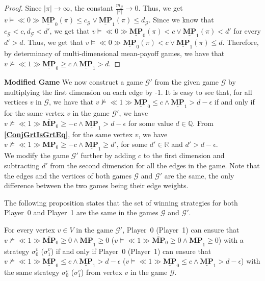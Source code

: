 \begin{proof}
    Since $|\pi| \to \infty$, the constant $\frac{m_\mathcal{G}}{|\pi|} \to 0$. Thus, we get $v \models \ll 0 \gg \underline{\mathbf{MP}}_0(\pi) \leqslant c_\mathcal{G} \lor \underline{\mathbf{MP}}_1(\pi) \leqslant d_\mathcal{G}$. Since we know that $c_\mathcal{G} < c, d_\mathcal{G} < d'$, we get that $v \models \ll 0 \gg \underline{\mathbf{MP}}_0(\pi) < c \lor \underline{\mathbf{MP}}_1(\pi) < d'$ for every $d' > d$. Thus, we get that  $v \models \ll 0 \gg \underline{\mathbf{MP}}_0(\pi) < c \lor \underline{\mathbf{MP}}_1(\pi) \leqslant d$. Therefore, by determinacy of multi-dimensional mean-payoff games, we have that $v \nvDash \ll 1 \gg \underline{\mathbf{MP}}_0 \geqslant c \land \underline{\mathbf{MP}}_1 > d$.
\end{proof}

\textbf{Modified Game} We now construct a game $\mathcal{G'}$ from the given game $\mathcal{G}$ by multiplying the first dimension on each edge by -1. It is easy to see that, for all vertices $v$ in $\mathcal{G}$, we have that $v \nvDash \ll 1 \gg \underline{\mathbf{MP}}_0 \leqslant c \land \underline{\mathbf{MP}}_1 > d-\epsilon$ if and only if for the same vertex $v$ in the game $\mathcal{G'}$, we have $v \nvDash \ll 1 \gg \overline{\mathbf{MP}}_0 \geqslant -c \land \underline{\mathbf{MP}}_1 > d-\epsilon$ for some value $d \in \mathbb{Q}$. From \textbf{\cref{ConjGrtIsGrtEq}}, for the same vertex $v$, we have $v \nvDash \ll 1 \gg \overline{\mathbf{MP}}_0 \geqslant -c \land \underline{\mathbf{MP}}_1 \geqslant d'$, for some $d' \in \mathbb{R}$ and $d' > d - \epsilon$. \\ \noindent
We modify the game $\mathcal{G'}$ further by adding $c$ to the first dimension and subtracting $d'$ from the second dimension for all the edges in the game. Note that the edges and the vertices of both games $\mathcal{G}$ and $\mathcal{G'}$ are the same, the only difference between the two games being their edge weights.

\noindent The following proposition states that the set of winning strategies for both Player~0 and Player~1 are the same in the games $\mathcal{G}$ and $\mathcal{G'}$.

\begin{proposition}
    \label{PropGamStrEqNewGamStr}
    For every vertex $v \in V$ in the game $\mathcal{G'}$, Player~0 (Player~1) can ensure that $v \nvDash \ll 1 \gg \overline{\mathbf{MP}}_0 \geqslant 0 \land \underline{\mathbf{MP}}_1 \geqslant 0$ ($v \models \ll 1 \gg \overline{\mathbf{MP}}_0 \geqslant 0 \land \underline{\mathbf{MP}}_1 \geqslant 0$) with a strategy $\sigma_0^{v}$ ($\sigma_1^{v}$) if and only if Player~0 (Player~1) can ensure that $v \nvDash \ll 1 \gg \underline{\mathbf{MP}}_0 \leqslant c \land \underline{\mathbf{MP}}_1 > d-\epsilon$ ($v \models \ll 1 \gg \underline{\mathbf{MP}}_0 \leqslant c \land \underline{\mathbf{MP}}_1 > d-\epsilon$) with the same strategy $\sigma_0^{v}$ ($\sigma_1^{v}$) from vertex $v$ in the game $\mathcal{G}$.
\end{proposition}

